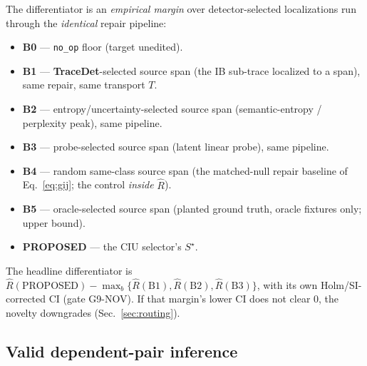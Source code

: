 \documentclass[11pt]{article}
\theoremstyle{plain}
\theoremstyle{definition}
\newcommand{\Rhat}{\widehat{R}}
\newcommand{\Sstar}{S^{\star}}
\begin{document}
The differentiator is an \emph{empirical margin} over detector-selected
localizations run through the \emph{identical} repair pipeline:
\begin{itemize}[leftmargin=1.4em,itemsep=1pt]
  \item \textbf{B0} --- \texttt{no\_op} floor (target unedited).
  \item \textbf{B1} --- \textbf{TraceDet}-selected \cite{tracedet2026diffusion}
  source span (the IB sub-trace localized to a span), same repair, same transport $T$.
  \item \textbf{B2} --- entropy/uncertainty-selected source span (semantic-entropy /
  perplexity peak), same pipeline.
  \item \textbf{B3} --- probe-selected source span (latent linear probe), same pipeline.
  \item \textbf{B4} --- random same-class source span (the matched-null repair
  baseline of Eq.~\ref{eq:gij}; the control \emph{inside} $\Rhat$).
  \item \textbf{B5} --- oracle-selected source span (planted ground truth, oracle
  fixtures only; upper bound).
  \item \textbf{PROPOSED} --- the CIU selector's $\Sstar$.
\end{itemize}
The headline differentiator is $\Rhat(\text{PROPOSED})-\max_b\{\Rhat(\text{B1}),\Rhat(\text{B2}),\Rhat(\text{B3})\}$,
with its own Holm/SI-corrected CI (gate G9-NOV). If that margin's lower CI does not
clear $0$, the novelty downgrades (Sec.~\ref{sec:routing}).

\subsection{Valid dependent-pair inference}\label{sec:method:inference}
\end{document}
